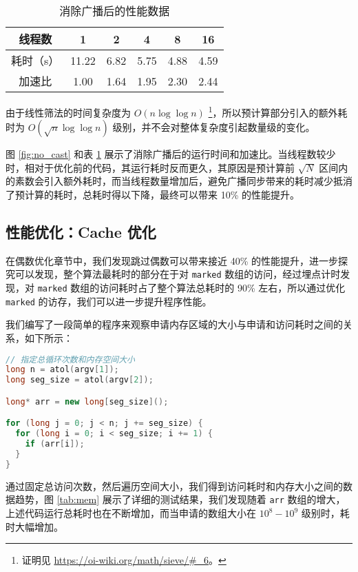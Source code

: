 \documentclass[11pt]{article}
\begin{document}
  \begin{table}[h]
    \centering
    \caption{消除广播后的性能数据}
    \label{tab:no_cast}
    \begin{tabular}{cccccc}
      \hline
      线程数 & 1 & 2 & 4 & 8 & 16 \\
      \hline
      耗时（s） & 11.22 & 6.82 & 5.75 & 4.88 & 4.59 \\
      \hline
      加速比 & 1.00 & 1.64 & 1.95 & 2.30 & 2.44 \\
      \hline
    \end{tabular}
  \end{table}

  由于线性筛法的时间复杂度为 $O(n \log \log n)$ \footnote{证明见 \url{https://oi-wiki.org/math/sieve/#_6}。}，所以预计算部分引入的额外耗时为 $O(\sqrt{n} \log \log n)$ 级别，并不会对整体复杂度引起数量级的变化。

  图 \ref{fig:no_cast} 和表 \ref{tab:no_cast} 展示了消除广播后的运行时间和加速比。当线程数较少时，相对于优化前的代码，其运行耗时反而更久，其原因是预计算前 $\sqrt{N}$ 区间内的素数会引入额外耗时，而当线程数量增加后，避免广播同步带来的耗时减少抵消了预计算的耗时，总耗时得以下降，最终可以带来 10\% 的性能提升。

  \subsection{性能优化：Cache 优化}
  在偶数优化章节中，我们发现跳过偶数可以带来接近 40\% 的性能提升，进一步探究可以发现，整个算法最耗时的部分在于对 \verb|marked| 数组的访问，经过埋点计时发现，对 \verb|marked| 数组的访问耗时占了整个算法总耗时的 90\% 左右，所以通过优化 \verb|marked| 的访存，我们可以进一步提升程序性能。

  我们编写了一段简单的程序来观察申请内存区域的大小与申请和访问耗时之间的关系，如下所示：
  \begin{file}
    \begin{lstlisting}[language=C++]
// 指定总循环次数和内存空间大小
long n = atol(argv[1]);
long seg_size = atol(argv[2]);

long* arr = new long[seg_size]();

for (long j = 0; j < n; j += seg_size) {
  for (long i = 0; i < seg_size; i += 1) {
    if (arr[i]);
  }
}
  \end{lstlisting}
  \end{file}

  通过固定总访问次数，然后遍历空间大小，我们得到访问耗时和内存大小之间的数据趋势，图 \ref{tab:mem} 展示了详细的测试结果，我们发现随着 \verb|arr| 数组的增大，上述代码运行总耗时也在不断增加，而当申请的数组大小在 $10^8 - 10^9$ 级别时，耗时大幅增加。
\end{document}
